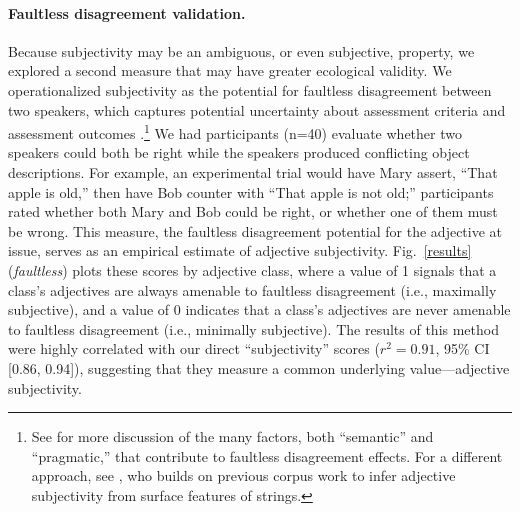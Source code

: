 \documentclass[12pt]{article}
\newcommand{\gcs}[1]{\textcolor{blue}{[gcs: #1]}}
\begin{document}
\paragraph{Faultless disagreement validation.} Because subjectivity may be an ambiguous, or even subjective, property, we explored a second measure that may have greater ecological validity. 
We operationalized subjectivity as the potential for faultless disagreement between two speakers, which captures potential uncertainty about assessment criteria and assessment outcomes \citep{Kolbel2004,kennedy2013,barker2013}.\footnote{See \cite{MacFarlane2014} for more discussion of the many factors, both ``semantic'' and ``pragmatic,'' that contribute to faultless disagreement effects. For a different approach, see \cite{hill2012}, who builds on previous corpus work \citep{wulff2003} to infer adjective subjectivity from surface features of strings.}
We had participants (n=40) evaluate whether two speakers could both be right while the speakers produced conflicting object descriptions. For example, an experimental trial would have Mary assert, ``That apple is old,'' then have Bob counter with ``That apple is not old;'' 
participants rated whether both Mary and Bob could be right, or whether one of them must be wrong. This measure, the faultless disagreement potential for the adjective at issue, serves as an empirical estimate of adjective subjectivity. 
Fig.\ \ref{results} (\emph{faultless}) plots these scores by adjective class, where a value of 1 signals that a class's adjectives are always amenable to faultless disagreement (i.e., maximally subjective), and a value of 0 indicates that a class's adjectives are never amenable to faultless disagreement (i.e., minimally subjective).
The results of this method were highly correlated with our direct ``subjectivity'' scores ($r^{2} = 0.91$, 95\% CI [0.86, 0.94]), suggesting that they measure a common underlying value---adjective subjectivity. 

\end{document}
